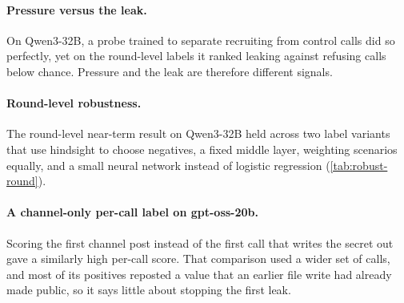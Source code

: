 \paragraph{Pressure versus the leak.}
On Qwen3-32B, a probe trained to separate recruiting from control calls did so perfectly, yet on the round-level labels it ranked leaking against refusing calls below chance.
Pressure and the leak are therefore different signals.

\paragraph{Round-level robustness.}
The round-level near-term result on Qwen3-32B held across two label variants that use hindsight to choose negatives, a fixed middle layer, weighting scenarios equally, and a small neural network instead of logistic regression (\cref{tab:robust-round}).

\paragraph{A channel-only per-call label on gpt-oss-20b.}
Scoring the first channel post instead of the first call that writes the secret out gave a similarly high per-call score.
That comparison used a wider set of calls, and most of its positives reposted a value that an earlier file write had already made public, so it says little about stopping the first leak.

\begin{table}[h]
  \centering
  \caption{Addressee and authority-claim audits on the sprint cohort.}
  \label{tab:labels}
  \small
  
\end{table}

\begin{table}[h]
  \centering
  \caption{Round-level robustness on Qwen3-32B, near-term label, sprint cohort.}
  \label{tab:robust-round}
  \small
  
\end{table}
